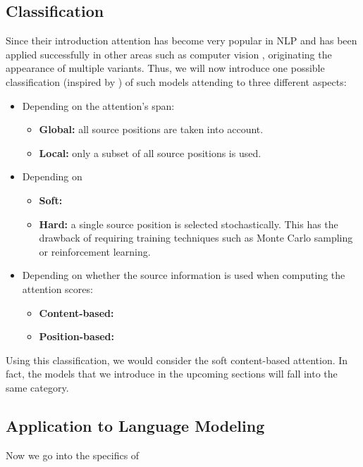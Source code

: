 \subsection{Classification}

Since their introduction attention has become very popular in NLP and has been applied successfully in other areas such as computer vision \cite{xu2015show}, originating the appearance of multiple variants. Thus, we will now introduce one possible classification (inspired by \cite{luongeffective}) of such models attending to three different aspects:

\begin{itemize}
	\item  Depending on the attention's span:
		\begin{itemize}
			\itemsep 0em
			\item  \textbf{Global:} all source positions are taken into account.
			\item  \textbf{Local:} only a subset of all source positions is used.
		\end{itemize}
	\item  Depending on 
		\begin{itemize}
			\itemsep 0em
			\item  \textbf{Soft:}
			\item  \textbf{Hard:} a single source position is selected stochastically. This has the drawback of requiring training techniques such as Monte Carlo sampling or reinforcement learning.
		\end{itemize}
	\item  Depending on whether the source information is used when computing the attention scores:
		\begin{itemize}
			\itemsep 0em
			\item  \textbf{Content-based:}
			\item  \textbf{Position-based:}
		\end{itemize}	
\end{itemize}

Using this classification, we would consider the  soft content-based  attention. In fact, the models that we introduce in the upcoming sections will fall into the same category.

\subsection{Application to Language Modeling}

Now we go into the specifics of \cite{daniluk2017frustratingly}

